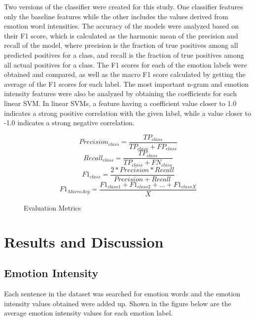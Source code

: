 \documentclass[journal]{./IEEE/IEEEtran}
\begin{document}
Two versions of the classifier were created for this study. One classifier features only the baseline features while the other includes the values derived from emotion word intensities. The accuracy of the models were analyzed based on their F1 score, which is calculated as the harmonic mean of the precision and recall of the model, where precision is the fraction of true positives among all predicted positives for a class, and recall is the fraction of true positives among all actual positives for a class. The F1 scores for each of the emotion labels were obtained and compared, as well as the macro F1 score calculated by getting the average of the F1 scores for each label. The most important n-gram and emotion intensity features were also be analyzed by obtaining the coefficients for each linear SVM. In linear SVMs, a feature having a coefficient value closer to 1.0 indicates a strong positive correlation with the given label, while a value closer to -1.0 indicates a strong negative correlation.

\begin{figure}[h!]
    \begin{equation*}
    {Precision_{class} = \frac{TP_{class}}{TP_{class}+FP_{class}}}
    \end{equation*}
    \begin{equation*}
    {Recall_{class} = \frac{TP_{class}}{TP_{class}+FN_{class}}}
    \end{equation*}
    \begin{equation*}
    {F1_{class} = \frac{2 * Precision * Recall}{Precision + Recall}}
    \end{equation*}
    \begin{equation*}
    {F1_{MacroAvg} = \frac{F1_{class1}+F1_{class2}+...+F1_{classX}}{X}}
    \end{equation*}
    \caption{Evaluation Metrics}
\end{figure}

\section{Results and Discussion}
\subsection{Emotion Intensity}
Each sentence in the dataset was searched for emotion words and the emotion intensity values obtained were added up. Shown in the figure below are the average emotion intensity values for each emotion label.
\end{document}
